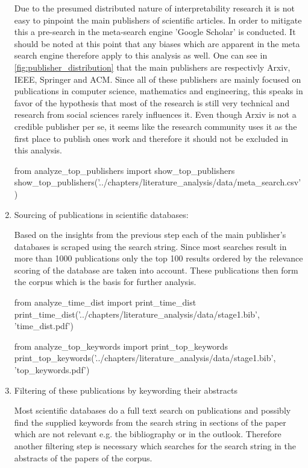 \begin{enumerate}
	Due to the presumed distributed nature of interpretability research it is not easy to pinpoint the main publishers of scientific articles. In order to mitigate this a pre-search in the meta-search engine 'Google Scholar' is conducted. It should be noted at this point that any biases which are apparent in the meta search engine therefore apply to this analysis as well. One can see in \autoref{fig:publisher_distribution} that the main publishers are respectivly Arxiv, IEEE, Springer and ACM. Since all of these publishers are mainly focused on publications in computer science, mathematics and engineering, this speaks in favor of the hypothesis that most of the research is still very technical and research from social sciences rarely influences it. Even though Arxiv is not a credible publisher per se, it seems like the research community uses it as the first place to publish ones work and therefore it should not be excluded in this analysis. 
	
\begin{pycode}
from analyze_top_publishers import show_top_publishers
show_top_publishers('../chapters/literature_analysis/data/meta_search.csv')
\end{pycode}

	\item Sourcing of publications in scientific databases:
	
	Based on the insights from the previous step each of the main publisher's databases is scraped using the search string. Since most searches result in more than 1000 publications only the top 100 results ordered by the relevance scoring of the database are taken into account. These publications then form the corpus which is the basis for further analysis.

\begin{pycode}
from analyze_time_dist import print_time_dist
print_time_dist('../chapters/literature_analysis/data/stage1.bib', 'time_dist.pdf')
\end{pycode}

\begin{pycode}
from analyze_top_keywords import print_top_keywords
print_top_keywords('../chapters/literature_analysis/data/stage1.bib', 'top_keywords.pdf')
\end{pycode}
	
	\item Filtering of these publications by keywording their abstracts
	
	Most scientific databases do a full text search on publications and possibly find the supplied keywords from the search string in sections of the paper which are not relevant e.g. the bibliography or in the outlook. Therefore another filtering step is necessary which searches for the search string in the abstracts of the papers of the corpus.
	

\end{enumerate}
